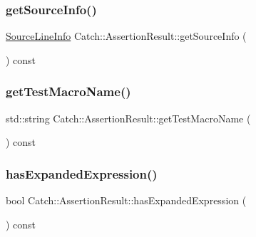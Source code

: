 \hypertarget{class_catch_1_1_assertion_result_aa4d3fdbfe276a69a035762dbb790800f}{}\label{class_catch_1_1_assertion_result_aa4d3fdbfe276a69a035762dbb790800f} 
\subsubsection{\texorpdfstring{get\+Source\+Info()}{getSourceInfo()}}
{\footnotesize\ttfamily \hyperlink{struct_catch_1_1_source_line_info}{Source\+Line\+Info} Catch\+::\+Assertion\+Result\+::get\+Source\+Info (\begin{DoxyParamCaption}{ }\end{DoxyParamCaption}) const}

\hypertarget{class_catch_1_1_assertion_result_aaefd9a0384282fd08a4a72aa19bd0628}{}\label{class_catch_1_1_assertion_result_aaefd9a0384282fd08a4a72aa19bd0628} 
\subsubsection{\texorpdfstring{get\+Test\+Macro\+Name()}{getTestMacroName()}}
{\footnotesize\ttfamily std\+::string Catch\+::\+Assertion\+Result\+::get\+Test\+Macro\+Name (\begin{DoxyParamCaption}{ }\end{DoxyParamCaption}) const}

\hypertarget{class_catch_1_1_assertion_result_a78c43506c2b3d8cc1fb141a97d09ec94}{}\label{class_catch_1_1_assertion_result_a78c43506c2b3d8cc1fb141a97d09ec94} 
\subsubsection{\texorpdfstring{has\+Expanded\+Expression()}{hasExpandedExpression()}}
{\footnotesize\ttfamily bool Catch\+::\+Assertion\+Result\+::has\+Expanded\+Expression (\begin{DoxyParamCaption}{ }\end{DoxyParamCaption}) const}


